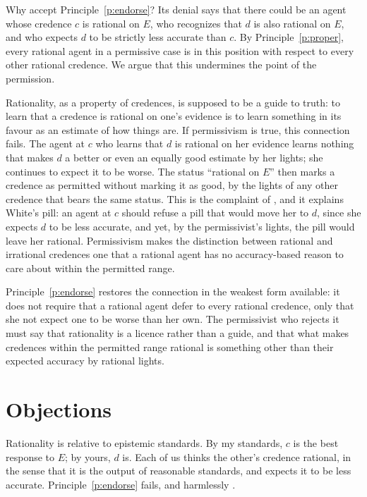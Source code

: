 \documentclass{situationist-preprint}
\begin{document}
Why accept Principle~\ref{p:endorse}? Its denial says that there could be an agent whose credence $c$ is rational on $E$, who recognizes that $d$ is also rational on $E$, and who expects $d$ to be strictly less accurate than $c$. By Principle~\ref{p:proper}, every rational agent in a permissive case is in this position with respect to every other rational credence. We argue that this undermines the point of the permission.

Rationality, as a property of credences, is supposed to be a guide to truth: to learn that a credence is rational on one's evidence is to learn something in its favour as an estimate of how things are. If permissivism is true, this connection fails. The agent at $c$ who learns that $d$ is rational on her evidence learns nothing that makes $d$ a better or even an equally good estimate by her lights; she continues to expect it to be worse. The status \enquote{rational on $E$} then marks a credence as permitted without marking it as good, by the lights of any other credence that bears the same status. This is the complaint of \citet{Horowitz2014}, and it explains White's pill: an agent at $c$ should refuse a pill that would move her to $d$, since she expects $d$ to be less accurate, and yet, by the permissivist's lights, the pill would leave her rational. Permissivism makes the distinction between rational and irrational credences one that a rational agent has no accuracy-based reason to care about within the permitted range.

Principle~\ref{p:endorse} restores the connection in the weakest form available: it does not require that a rational agent defer to every rational credence, only that she not expect one to be worse than her own. The permissivist who rejects it must say that rationality is a licence rather than a guide, and that what makes credences within the permitted range rational is something other than their expected accuracy by rational lights.

\section{Objections}

\begin{objection}[Standards]
Rationality is relative to epistemic standards. By my standards, $c$ is the best response to $E$; by yours, $d$ is. Each of us thinks the other's credence rational, in the sense that it is the output of reasonable standards, and expects it to be less accurate. Principle~\ref{p:endorse} fails, and harmlessly \citep{Schoenfield2014}.
\end{objection}
\end{document}
